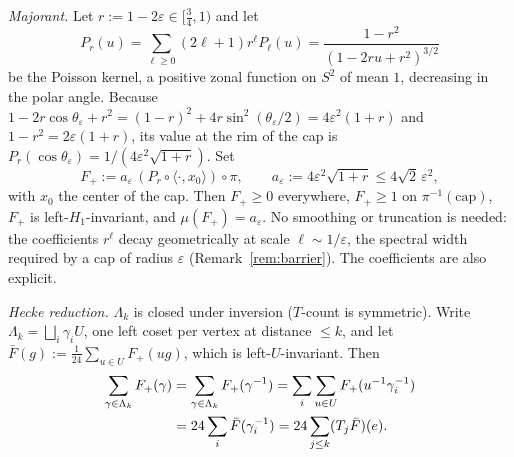 \documentclass[aps,prx,twocolumn,superscriptaddress,nofootinbib,longbibliography]{revtex4-2}
\theoremstyle{plain}
\theoremstyle{definition}
\theoremstyle{remark}
\begin{document}
\emph{Majorant.} Let $r:=1-2\varepsilon\in[\tfrac34,1)$ and let
\begin{equation}
P_r(u)=\sum_{\ell\ge0}(2\ell+1)r^\ell P_\ell(u)=\frac{1-r^2}{(1-2ru+r^2)^{3/2}}
\end{equation}
be the Poisson kernel, a positive zonal function on $S^2$ of mean $1$, decreasing in the polar angle. Because $1-2r\cos\theta_\varepsilon+r^2=(1-r)^2+4r\sin^2(\theta_\varepsilon/2)=4\varepsilon^2(1+r)$ and $1-r^2=2\varepsilon(1+r)$, its value at the rim of the cap is $P_r(\cos\theta_\varepsilon)=1/(4\varepsilon^2\sqrt{1+r})$. Set
\begin{equation}
F_+:=a_\varepsilon\,(P_r\circ\langle\cdot,x_0\rangle)\circ\pi,\qquad a_\varepsilon:=4\varepsilon^2\sqrt{1+r}\le4\sqrt2\,\varepsilon^2,
\end{equation}
with $x_0$ the center of the cap. Then $F_+\ge0$ everywhere, $F_+\ge1$ on $\pi^{-1}(\mathrm{cap})$, $F_+$ is left-$H_1$-invariant, and $\mu(F_+)=a_\varepsilon$. No smoothing or truncation is needed: the coefficients $r^\ell$ decay geometrically at scale $\ell\sim1/\varepsilon$, the spectral width required by a cap of radius $\varepsilon$ (Remark~\ref{rem:barrier}). The coefficients are also explicit.

\emph{Hecke reduction.} $\Lambda_k$ is closed under inversion ($T$-count is symmetric). Write $\Lambda_k=\bigsqcup_i\gamma_iU$, one left coset per vertex at distance $\le k$, and let $\bar F(g):=\frac1{24}\sum_{u\in U}F_+(ug)$, which is left-$U$-invariant. Then
\begin{align}
\sum_{\gamma\in\Lambda_k}F_+(\gamma)&=\sum_{\gamma\in\Lambda_k}F_+(\gamma^{-1})=\sum_i\sum_{u\in U}F_+(u^{-1}\gamma_i^{-1})\notag\\
&=24\sum_i\bar F(\gamma_i^{-1})=24\sum_{j\le k}(T_j\bar F)(e).
\end{align}
\end{document}
